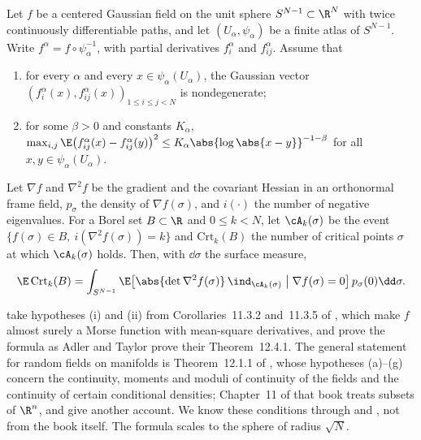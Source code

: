 \begin{refsection}
\begin{theorem}\label{thm:toolkit:kacrice}
Let $f$ be a centered Gaussian field on the unit sphere $S^{N-1}\subset\R^N$ with twice continuously differentiable paths, and let $(U_\alpha,\psi_\alpha)$ be a finite atlas of $S^{N-1}$. Write $f^\alpha=f\circ\psi_\alpha^{-1}$, with partial derivatives $f^\alpha_i$ and $f^\alpha_{ij}$. Assume that
\begin{enumerate}
\item for every $\alpha$ and every $x\in\psi_\alpha(U_\alpha)$, the Gaussian vector $(f^\alpha_i(x),f^\alpha_{ij}(x))_{1\le i\le j<N}$ is nondegenerate;
\item for some $\beta>0$ and constants $K_\alpha$, $\max_{i,j}\E\bigl(f^\alpha_{ij}(x)-f^\alpha_{ij}(y)\bigr)^2\le K_\alpha\abs{\log\abs{x-y}}^{-1-\beta}$ for all $x,y\in\psi_\alpha(U_\alpha)$.
\end{enumerate}
Let $\nabla f$ and $\nabla^2f$ be the gradient and the covariant Hessian in an orthonormal frame field, $p_\sigma$ the density of $\nabla f(\sigma)$, and $i(\cdot)$ the number of negative eigenvalues. For a Borel set $B\subset\R$ and $0\le k<N$, let $\cA_k(\sigma)$ be the event $\{f(\sigma)\in B,\ i(\nabla^2f(\sigma))=k\}$ and $\mathrm{Crt}_k(B)$ the number of critical points $\sigma$ at which $\cA_k(\sigma)$ holds. Then, with $\dd\sigma$ the surface measure,
\begin{equation}\label{eq:toolkit:kacrice}
\E\,\mathrm{Crt}_k(B)=\int_{S^{N-1}}\E\bigl[\abs{\det\nabla^2f(\sigma)}\,\ind_{\cA_k(\sigma)}\bigm|\nabla f(\sigma)=0\bigr]\,p_\sigma(0)\dd\sigma.
\end{equation}
\end{theorem}

\Textcite{AuffingerBenArousCerny2013} take hypotheses (i) and (ii) from Corollaries~11.3.2 and~11.3.5 of \textcite{AdlerTaylor2007}, which make $f$ almost surely a Morse function with mean-square derivatives, and prove the formula as Adler and Taylor prove their Theorem~12.4.1. The general statement for random fields on manifolds is Theorem~12.1.1 of \textcite{AdlerTaylor2007}, whose hypotheses (a)--(g) concern the continuity, moments and moduli of continuity of the fields and the continuity of certain conditional densities; Chapter~11 of that book treats subsets of $\R^n$, and \textcite{AzaisWschebor2009} give another account. We know these conditions through \textcite{AuffingerBenArousCerny2013} and \textcite[Appendix~III]{Subag2017a}, not from the book itself. The formula scales to the sphere of radius $\sqrt N$.


\end{refsection}
